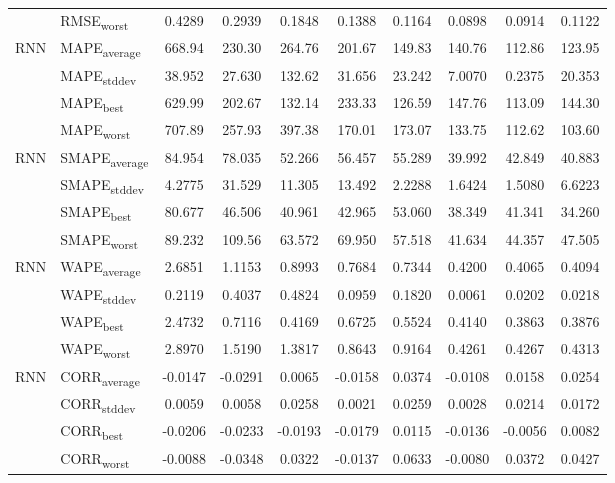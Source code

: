{\begin{longtable}{l l c c c c c c c c}
 & RMSE\textsubscript{worst} & 0.4289 & 0.2939 & 0.1848 & 0.1388 & 0.1164 & 0.0898 & 0.0914 & 0.1122 \\
\cmidrule(lr){2-10}
\multirow{4}{*}{RNN} & MAPE\textsubscript{average} & 668.94 & 230.30 & 264.76 & 201.67 & 149.83 & 140.76 & 112.86 & 123.95 \\
 & MAPE\textsubscript{stddev} & 38.952 & 27.630 & 132.62 & 31.656 & 23.242 & 7.0070 & 0.2375 & 20.353 \\
 & MAPE\textsubscript{best} & 629.99 & 202.67 & 132.14 & 233.33 & 126.59 & 147.76 & 113.09 & 144.30 \\
 & MAPE\textsubscript{worst} & 707.89 & 257.93 & 397.38 & 170.01 & 173.07 & 133.75 & 112.62 & 103.60 \\
\cmidrule(lr){2-10}
\multirow{4}{*}{RNN} & SMAPE\textsubscript{average} & 84.954 & 78.035 & 52.266 & 56.457 & 55.289 & 39.992 & 42.849 & 40.883 \\
 & SMAPE\textsubscript{stddev} & 4.2775 & 31.529 & 11.305 & 13.492 & 2.2288 & 1.6424 & 1.5080 & 6.6223 \\
 & SMAPE\textsubscript{best} & 80.677 & 46.506 & 40.961 & 42.965 & 53.060 & 38.349 & 41.341 & 34.260 \\
 & SMAPE\textsubscript{worst} & 89.232 & 109.56 & 63.572 & 69.950 & 57.518 & 41.634 & 44.357 & 47.505 \\
\cmidrule(lr){2-10}
\multirow{4}{*}{RNN} & WAPE\textsubscript{average} & 2.6851 & 1.1153 & 0.8993 & 0.7684 & 0.7344 & 0.4200 & 0.4065 & 0.4094 \\
 & WAPE\textsubscript{stddev} & 0.2119 & 0.4037 & 0.4824 & 0.0959 & 0.1820 & 0.0061 & 0.0202 & 0.0218 \\
 & WAPE\textsubscript{best} & 2.4732 & 0.7116 & 0.4169 & 0.6725 & 0.5524 & 0.4140 & 0.3863 & 0.3876 \\
 & WAPE\textsubscript{worst} & 2.8970 & 1.5190 & 1.3817 & 0.8643 & 0.9164 & 0.4261 & 0.4267 & 0.4313 \\
\cmidrule(lr){2-10}
\multirow{4}{*}{RNN} & CORR\textsubscript{average} & -0.0147 & -0.0291 & 0.0065 & -0.0158 & 0.0374 & -0.0108 & 0.0158 & 0.0254 \\
 & CORR\textsubscript{stddev} & 0.0059 & 0.0058 & 0.0258 & 0.0021 & 0.0259 & 0.0028 & 0.0214 & 0.0172 \\
 & CORR\textsubscript{best} & -0.0206 & -0.0233 & -0.0193 & -0.0179 & 0.0115 & -0.0136 & -0.0056 & 0.0082 \\
 & CORR\textsubscript{worst} & -0.0088 & -0.0348 & 0.0322 & -0.0137 & 0.0633 & -0.0080 & 0.0372 & 0.0427 \\

\end{longtable}}
